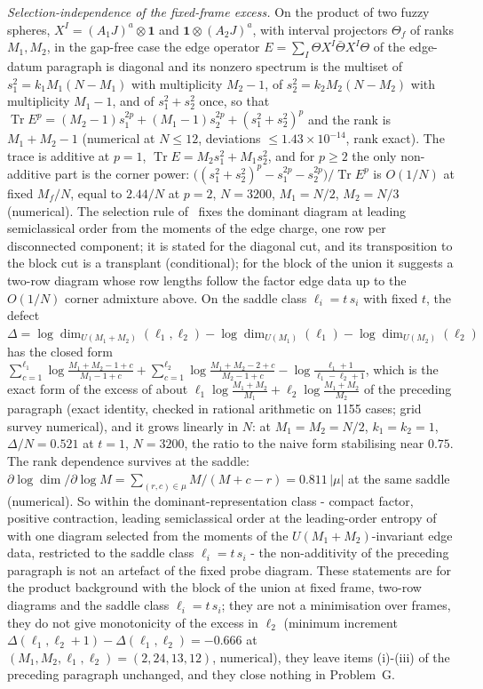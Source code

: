 \emph{Selection-independence of the fixed-frame excess.} On the product of two fuzzy spheres, \(X^I=(A_1J)^a\otimes\mathbf 1\) and \(\mathbf 1\otimes(A_2J)^a\), with interval projectors \(\Theta_f\) of ranks \(M_1,M_2\), in the gap-free case the edge operator \(E=\sum_I\Theta X^I\bar\Theta X^I\Theta\) of the edge-datum paragraph is diagonal and its nonzero spectrum is the multiset of \(s_1^2=k_1M_1(N-M_1)\) with multiplicity \(M_2-1\), of \(s_2^2=k_2M_2(N-M_2)\) with multiplicity \(M_1-1\), and of \(s_1^2+s_2^2\) once, so that \(\operatorname{Tr}E^p=(M_2-1)s_1^{2p}+(M_1-1)s_2^{2p}+(s_1^2+s_2^2)^p\) and the rank is \(M_1+M_2-1\) (numerical at \(N\le12\), deviations \(\le1.43\times10^{-14}\), rank exact).
The trace is additive at \(p=1\), \(\operatorname{Tr}E=M_2s_1^2+M_1s_2^2\), and for \(p\ge2\) the only non-additive part is the corner power: \(\bigl((s_1^2+s_2^2)^p-s_1^{2p}-s_2^{2p}\bigr)/\operatorname{Tr}E^p\) is \(O(1/N)\) at fixed \(M_f/N\), equal to \(2.44/N\) at \(p=2\), \(N=3200\), \(M_1=N/2\), \(M_2=N/3\) (numerical).
The selection rule of~\cite{Frenkel2023EdgeModes} fixes the dominant diagram at leading semiclassical order from the moments of the edge charge, one row per disconnected component; it is stated for the diagonal cut, and its transposition to the block cut is a transplant (conditional); for the block of the union it suggests a two-row diagram whose row lengths follow the factor edge data up to the \(O(1/N)\) corner admixture above.
On the saddle class \(\ell_i=t\,s_i\) with fixed \(t\), the defect \(\Delta=\log\dim_{U(M_1+M_2)}(\ell_1,\ell_2)-\log\dim_{U(M_1)}(\ell_1)-\log\dim_{U(M_2)}(\ell_2)\) has the closed form \(\sum_{c=1}^{\ell_1}\log\frac{M_1+M_2-1+c}{M_1-1+c}+\sum_{c=1}^{\ell_2}\log\frac{M_1+M_2-2+c}{M_2-1+c}-\log\frac{\ell_1+1}{\ell_1-\ell_2+1}\), which is the exact form of the excess of about \(\ell_1\log\frac{M_1+M_2}{M_1}+\ell_2\log\frac{M_1+M_2}{M_2}\) of the preceding paragraph (exact identity, checked in rational arithmetic on 1155 cases; grid survey numerical), and it grows linearly in \(N\): at \(M_1=M_2=N/2\), \(k_1=k_2=1\), \(\Delta/N=0.521\) at \(t=1\), \(N=3200\), the ratio to the naive form stabilising near \(0.75\).
The rank dependence survives at the saddle: \(\partial\log\dim/\partial\log M=\sum_{(r,c)\in\mu}M/(M+c-r)=0.811\,|\mu|\) at the same saddle (numerical).
So within the dominant-representation class - compact factor, positive contraction, leading semiclassical order at the leading-order entropy of~\cite{FlissFrenkelHartnollSoni2025} with one diagram selected from the moments of the \(U(M_1+M_2)\)-invariant edge data, restricted to the saddle class \(\ell_i=t\,s_i\) - the non-additivity of the preceding paragraph is not an artefact of the fixed probe diagram.
These statements are for the product background with the block of the union at fixed frame, two-row diagrams and the saddle class \(\ell_i=t\,s_i\); they are not a minimisation over frames, they do not give monotonicity of the excess in \(\ell_2\) (minimum increment \(\Delta(\ell_1,\ell_2+1)-\Delta(\ell_1,\ell_2)=-0.666\) at \((M_1,M_2,\ell_1,\ell_2)=(2,24,13,12)\), numerical), they leave items (i)-(iii) of the preceding paragraph unchanged, and they close nothing in Problem~G.

